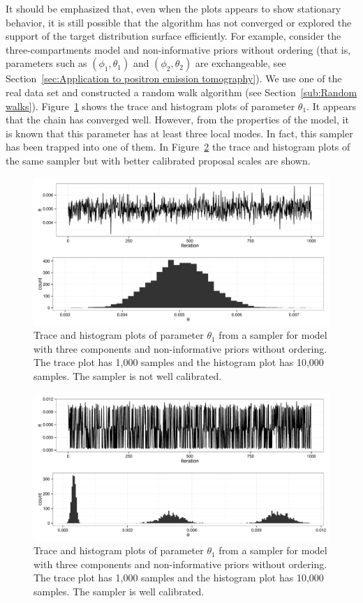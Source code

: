 It should be emphasized that, even when the plots appears to show stationary
behavior, it is still possible that the algorithm has not converged or
explored the support of the target distribution surface efficiently. For
example, consider the three-compartments \pet model and non-informative priors
without ordering (that is, parameters such as $(\phi_1,\theta_1)$ and
$(\phi_2,\theta_2)$ are exchangeable, see Section~\ref{sec:Application to
  positron emission tomography}). We use one of the real data set and
constructed a random walk algorithm (see Section~\ref{sub:Random walks}).
Figure~\ref{fig:pet diag} shows the trace and histogram plots of parameter
$\theta_1$. It appears that the \mcmc chain has converged well. However, from
the properties of the model, it is known that this parameter has at least
three local modes. In fact, this sampler has been trapped into one of them. In
Figure~\ref{fig:pet diag c} the trace and histogram plots of the same sampler
but with better calibrated proposal scales are shown.

\begin{figure}
  \includegraphics[width=\linewidth]{fig/PET_MH_Diag}
  \caption{Trace and histogram plots of parameter $\theta_1$ from a \mcmc
    sampler for \pet model with three components and non-informative priors
    without ordering. The trace plot has 1,000 samples and the histogram plot
    has 10,000 samples. The sampler is not well calibrated.}
  \label{fig:pet diag}
\end{figure}

\begin{figure}
  \includegraphics[width=\linewidth]{fig/PET_MH_Diag_C}
  \caption{Trace and histogram plots of parameter $\theta_1$ from a \mcmc
    sampler for \pet model with three components and non-informative priors
    without ordering. The trace plot has 1,000 samples and the histogram plot
    has 10,000 samples. The sampler is well calibrated.}
  \label{fig:pet diag c}
\end{figure}

